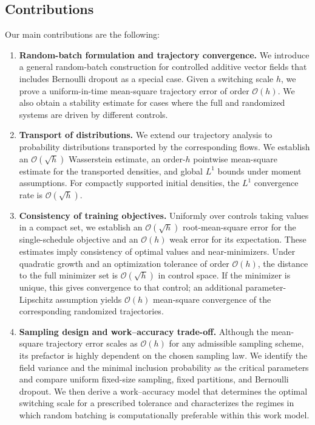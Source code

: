 \documentclass[twoside,11pt]{article}
\theoremstyle{plain}
\begin{document}
\subsection{Contributions}

Our main contributions are the following:

\begin{enumerate}

\item \textbf{Random-batch formulation and trajectory convergence.}
We introduce a general random-batch construction for controlled additive vector fields that includes Bernoulli dropout as a special case. Given a switching scale $h$, we prove a uniform-in-time mean-square trajectory error of order $\mathcal{O}(h)$. We also obtain a stability estimate for cases where the full and randomized systems are driven by different controls.

\item \textbf{Transport of distributions.}
We extend our trajectory analysis to probability distributions transported by the corresponding flows. We establish an $\mathcal{O}(\sqrt{h})$ Wasserstein estimate, an order-$h$ pointwise mean-square estimate for the transported densities, and global $L^1$ bounds under moment assumptions. For compactly supported initial densities, the $L^1$ convergence rate is $\mathcal{O}(\sqrt{h})$.

\item \textbf{Consistency of training objectives.}
Uniformly over controls taking values in a compact set, we establish an $\mathcal O(\sqrt h)$ root-mean-square error for the single-schedule objective and an $\mathcal O(h)$ weak error for its expectation. These estimates imply consistency of optimal values and near-minimizers. Under quadratic growth and an optimization tolerance of order $\mathcal O(h)$, the distance to the full minimizer set is $\mathcal O(\sqrt h)$ in control space. If the minimizer is unique, this gives convergence to that control; an additional parameter-Lipschitz assumption yields $\mathcal O(h)$ mean-square convergence of the corresponding randomized trajectories.

\item \textbf{Sampling design and work--accuracy trade-off.}
Although the mean-square trajectory error scales as $\mathcal{O}(h)$ for any admissible sampling scheme, its prefactor is highly dependent on the chosen sampling law. We identify the field variance and the minimal inclusion probability as the critical parameters and compare uniform fixed-size sampling, fixed partitions, and Bernoulli dropout. We then derive a work--accuracy model that determines the optimal switching scale for a prescribed tolerance and characterizes the regimes in which random batching is computationally preferable within this work model.

\end{enumerate}
\end{document}
